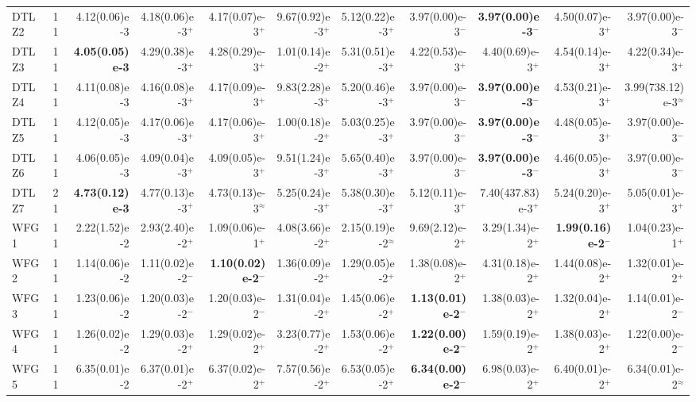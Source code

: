 \begin{longtable}{llrrrrrrrrr}
DTLZ2 & 11 & 4.12(0.06)e-3 & 4.18(0.06)e-3$^{+}$ & 4.17(0.07)e-3$^{+}$ & 9.67(0.92)e-3$^{+}$ & 5.12(0.22)e-3$^{+}$ & 3.97(0.00)e-3$^{-}$ & \textbf{3.97(0.00)e-3}$^{-}$ & 4.50(0.07)e-3$^{+}$ & 3.97(0.00)e-3$^{-}$ \\
DTLZ3 & 11 & \textbf{4.05(0.05)e-3} & 4.29(0.38)e-3$^{+}$ & 4.28(0.29)e-3$^{+}$ & 1.01(0.14)e-2$^{+}$ & 5.31(0.51)e-3$^{+}$ & 4.22(0.53)e-3$^{+}$ & 4.40(0.69)e-3$^{+}$ & 4.54(0.14)e-3$^{+}$ & 4.22(0.34)e-3$^{+}$ \\
DTLZ4 & 11 & 4.11(0.08)e-3 & 4.16(0.08)e-3$^{+}$ & 4.17(0.09)e-3$^{+}$ & 9.83(2.28)e-3$^{+}$ & 5.20(0.46)e-3$^{+}$ & 3.97(0.00)e-3$^{-}$ & \textbf{3.97(0.00)e-3}$^{-}$ & 4.53(0.21)e-3$^{+}$ & 3.99(738.12)e-3$^{\approx}$ \\
DTLZ5 & 11 & 4.12(0.05)e-3 & 4.17(0.06)e-3$^{+}$ & 4.17(0.06)e-3$^{+}$ & 1.00(0.18)e-2$^{+}$ & 5.03(0.25)e-3$^{+}$ & 3.97(0.00)e-3$^{-}$ & \textbf{3.97(0.00)e-3}$^{-}$ & 4.48(0.05)e-3$^{+}$ & 3.97(0.00)e-3$^{-}$ \\
DTLZ6 & 11 & 4.06(0.05)e-3 & 4.09(0.04)e-3$^{+}$ & 4.09(0.05)e-3$^{+}$ & 9.51(1.24)e-3$^{+}$ & 5.65(0.40)e-3$^{+}$ & 3.97(0.00)e-3$^{-}$ & \textbf{3.97(0.00)e-3}$^{-}$ & 4.46(0.05)e-3$^{+}$ & 3.97(0.00)e-3$^{-}$ \\
DTLZ7 & 21 & \textbf{4.73(0.12)e-3} & 4.77(0.13)e-3$^{+}$ & 4.73(0.13)e-3$^{\approx}$ & 5.25(0.24)e-3$^{+}$ & 5.38(0.30)e-3$^{+}$ & 5.12(0.11)e-3$^{+}$ & 7.40(437.83)e-3$^{+}$ & 5.24(0.20)e-3$^{+}$ & 5.05(0.01)e-3$^{+}$ \\
\midrule
WFG1 & 11 & 2.22(1.52)e-2 & 2.93(2.40)e-2$^{+}$ & 1.09(0.06)e-1$^{+}$ & 4.08(3.66)e-2$^{+}$ & 2.15(0.19)e-2$^{\approx}$ & 9.69(2.12)e-2$^{+}$ & 3.29(1.34)e-2$^{+}$ & \textbf{1.99(0.16)e-2}$^{-}$ & 1.04(0.23)e-1$^{+}$ \\
WFG2 & 11 & 1.14(0.06)e-2 & 1.11(0.02)e-2$^{-}$ & \textbf{1.10(0.02)e-2}$^{-}$ & 1.36(0.09)e-2$^{+}$ & 1.29(0.05)e-2$^{+}$ & 1.38(0.08)e-2$^{+}$ & 4.31(0.18)e-2$^{+}$ & 1.44(0.08)e-2$^{+}$ & 1.32(0.01)e-2$^{+}$ \\
WFG3 & 11 & 1.23(0.06)e-2 & 1.20(0.03)e-2$^{-}$ & 1.20(0.03)e-2$^{-}$ & 1.31(0.04)e-2$^{+}$ & 1.45(0.06)e-2$^{+}$ & \textbf{1.13(0.01)e-2}$^{-}$ & 1.38(0.03)e-2$^{+}$ & 1.32(0.04)e-2$^{+}$ & 1.14(0.01)e-2$^{-}$ \\
WFG4 & 11 & 1.26(0.02)e-2 & 1.29(0.03)e-2$^{+}$ & 1.29(0.02)e-2$^{+}$ & 3.23(0.77)e-2$^{+}$ & 1.53(0.06)e-2$^{+}$ & \textbf{1.22(0.00)e-2}$^{-}$ & 1.59(0.19)e-2$^{+}$ & 1.38(0.03)e-2$^{+}$ & 1.22(0.00)e-2$^{-}$ \\
WFG5 & 11 & 6.35(0.01)e-2 & 6.37(0.01)e-2$^{+}$ & 6.37(0.02)e-2$^{+}$ & 7.57(0.56)e-2$^{+}$ & 6.53(0.05)e-2$^{+}$ & \textbf{6.34(0.00)e-2}$^{-}$ & 6.98(0.03)e-2$^{+}$ & 6.40(0.01)e-2$^{+}$ & 6.34(0.01)e-2$^{\approx}$ \\

\end{longtable}
